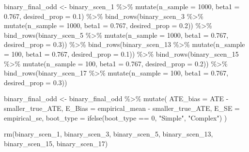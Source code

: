 \documentclass[
]{article}
\newenvironment{Shaded}{\begin{snugshade}}{\end{snugshade}}
\newcommand{\AttributeTok}[1]{\textcolor[rgb]{0.77,0.63,0.00}{#1}}
\newcommand{\DecValTok}[1]{\textcolor[rgb]{0.00,0.00,0.81}{#1}}
\newcommand{\FloatTok}[1]{\textcolor[rgb]{0.00,0.00,0.81}{#1}}
\newcommand{\FunctionTok}[1]{\textcolor[rgb]{0.00,0.00,0.00}{#1}}
\newcommand{\NormalTok}[1]{#1}
\newcommand{\OtherTok}[1]{\textcolor[rgb]{0.56,0.35,0.01}{#1}}
\newcommand{\SpecialCharTok}[1]{\textcolor[rgb]{0.00,0.00,0.00}{#1}}
\newcommand{\StringTok}[1]{\textcolor[rgb]{0.31,0.60,0.02}{#1}}
\begin{document}
\begin{Shaded}
\begin{Highlighting}[]
\NormalTok{binary\_final\_odd }\OtherTok{\textless{}{-}} 
\NormalTok{  binary\_scen\_1 }\SpecialCharTok{\%\textgreater{}\%} \FunctionTok{mutate}\NormalTok{(}\AttributeTok{n\_sample =} \DecValTok{1000}\NormalTok{, }\AttributeTok{beta1 =} \FloatTok{0.767}\NormalTok{, }\AttributeTok{desired\_prop =} \FloatTok{0.1}\NormalTok{) }\SpecialCharTok{\%\textgreater{}\%} 
  \FunctionTok{bind\_rows}\NormalTok{(binary\_scen\_3 }\SpecialCharTok{\%\textgreater{}\%} \FunctionTok{mutate}\NormalTok{(}\AttributeTok{n\_sample =} \DecValTok{1000}\NormalTok{, }\AttributeTok{beta1 =} \FloatTok{0.767}\NormalTok{, }\AttributeTok{desired\_prop =} \FloatTok{0.2}\NormalTok{)) }\SpecialCharTok{\%\textgreater{}\%}
  \FunctionTok{bind\_rows}\NormalTok{(binary\_scen\_5 }\SpecialCharTok{\%\textgreater{}\%} \FunctionTok{mutate}\NormalTok{(}\AttributeTok{n\_sample =} \DecValTok{1000}\NormalTok{, }\AttributeTok{beta1 =} \FloatTok{0.767}\NormalTok{, }\AttributeTok{desired\_prop =} \FloatTok{0.3}\NormalTok{)) }\SpecialCharTok{\%\textgreater{}\%}
  \FunctionTok{bind\_rows}\NormalTok{(binary\_scen\_13 }\SpecialCharTok{\%\textgreater{}\%} \FunctionTok{mutate}\NormalTok{(}\AttributeTok{n\_sample =} \DecValTok{100}\NormalTok{, }\AttributeTok{beta1 =} \FloatTok{0.767}\NormalTok{, }\AttributeTok{desired\_prop =} \FloatTok{0.1}\NormalTok{)) }\SpecialCharTok{\%\textgreater{}\%}
  \FunctionTok{bind\_rows}\NormalTok{(binary\_scen\_15 }\SpecialCharTok{\%\textgreater{}\%} \FunctionTok{mutate}\NormalTok{(}\AttributeTok{n\_sample =} \DecValTok{100}\NormalTok{, }\AttributeTok{beta1 =} \FloatTok{0.767}\NormalTok{, }\AttributeTok{desired\_prop =} \FloatTok{0.2}\NormalTok{)) }\SpecialCharTok{\%\textgreater{}\%}
  \FunctionTok{bind\_rows}\NormalTok{(binary\_scen\_17 }\SpecialCharTok{\%\textgreater{}\%} \FunctionTok{mutate}\NormalTok{(}\AttributeTok{n\_sample =} \DecValTok{100}\NormalTok{, }\AttributeTok{beta1 =} \FloatTok{0.767}\NormalTok{, }\AttributeTok{desired\_prop =} \FloatTok{0.3}\NormalTok{))}

\NormalTok{binary\_final\_odd }\OtherTok{\textless{}{-}}\NormalTok{ binary\_final\_odd }\SpecialCharTok{\%\textgreater{}\%} 
  \FunctionTok{mutate}\NormalTok{(}
    \AttributeTok{ATE\_bias =}\NormalTok{ ATE }\SpecialCharTok{{-}}\NormalTok{ smaller\_true\_ATE,}
    \AttributeTok{E\_Bias =}\NormalTok{ empirical\_mean }\SpecialCharTok{{-}}\NormalTok{ smaller\_true\_ATE,}
    \AttributeTok{E\_SE =}\NormalTok{ empirical\_se,}
    \AttributeTok{boot\_type =} \FunctionTok{ifelse}\NormalTok{(boot\_type }\SpecialCharTok{==} \DecValTok{0}\NormalTok{, }\StringTok{"Simple"}\NormalTok{, }\StringTok{"Complex"}\NormalTok{)}
\NormalTok{  ) }



\FunctionTok{rm}\NormalTok{(binary\_scen\_1, binary\_scen\_3, binary\_scen\_5, binary\_scen\_13, binary\_scen\_15, binary\_scen\_17)}
\end{Highlighting}
\end{Shaded}
\end{document}
